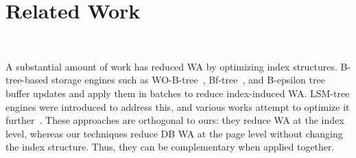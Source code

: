 \section{Related Work}~\label{sec:related}


A substantial amount of work has reduced WA by optimizing index structures.
B-tree-based storage engines such as WO-B-tree~\cite{WObtree}, Bf-tree~\cite{DBLP:journals/pvldb/HaoC24}, and B-epsilon tree~\cite{DBLP:journals/usenix-login/BenderFJJKPY015} buffer updates and apply them in batches to reduce index-induced WA.
LSM-tree engines were introduced to address this, and various works attempt to optimize it further~\cite{rocksdb-saf, leveldb, tigerbeetle_github, novelsm,DBLP:conf/edbt/VinconHRO0P18,LSMTreeCost_SIGMOD2024,Dayan_TODS2018,Liu2025_ArceKV,lsmdesign,Dayan_VLDB2022_Hybrid}.
These approaches are orthogonal to ours: they reduce WA at the index level, whereas our techniques reduce DB WA at the page level without changing the index structure.
Thus, they can be complementary when applied together.


